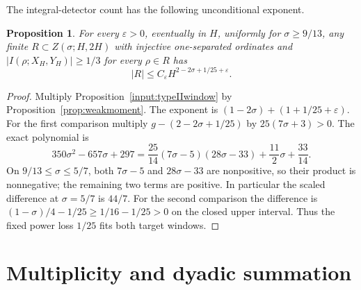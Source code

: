 \documentclass[11pt,a4paper,oneside]{article}
\newtheorem{proposition}[theorem]{Proposition}
\theoremstyle{definition}
\newcommand{\eps}{\varepsilon}
\numberwithin{equation}{section}
\begin{document}
The integral-detector count has the following unconditional exponent.
\begin{proposition}\label{prop:typeII}
For every $\eps>0$, eventually in $H$, uniformly for $\sigma\ge9/13$, any finite $R\subset Z(\sigma;H,2H)$ with injective one-separated ordinates and $|I(\rho;X_H,Y_H)|\ge1/3$ for every $\rho\in R$ has
\[
 |R|\le C_\eps H^{2-2\sigma+1/25+\eps}.
\]

\end{proposition}
\begin{proof}
Multiply Proposition~\ref{input:typeIIwindow} by Proposition~\ref{prop:weakmoment}.
The exponent is $(1-2\sigma)+(1+1/25+\eps)$.
For the first comparison multiply $g-(2-2\sigma+1/25)$ by
$25(7\sigma+3)>0$. The exact polynomial is
\[
 350\sigma^2-657\sigma+297
 =\frac{25}{14}(7\sigma-5)(28\sigma-33)
       +\frac{11}{2}\sigma+\frac{33}{14}.
\]
On $9/13\le\sigma\le5/7$, both $7\sigma-5$ and $28\sigma-33$ are
nonpositive, so their product is nonnegative; the remaining two terms are
positive. In particular the scaled difference at $\sigma=5/7$ is $44/7$.
For the second comparison the difference is
$(1-\sigma)/4-1/25\ge1/16-1/25>0$ on the closed upper interval.
Thus the fixed power loss $1/25$ fits both target windows.
\end{proof}
\section{Multiplicity and dyadic summation}\label{ch:counting}
\end{document}
